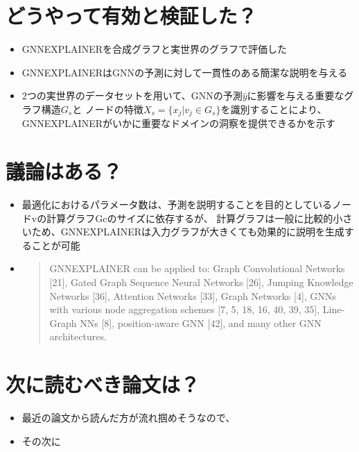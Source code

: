 \documentclass[a4paper,10pt]{ltjsarticle}
\newcommand{\1}{\mbox{1}\hspace{-0.25em}\mbox{l}}
\theoremstyle{definition}
\begin{document}
    \section{どうやって有効と検証した？}
    \begin{itemize}
        \item GNNEXPLAINERを合成グラフと実世界のグラフで評価した
        \item GNNEXPLAINERはGNNの予測に対して一貫性のある簡潔な説明を与える
        \item 2つの実世界のデータセットを用いて、GNNの予測$\hat{y}$に影響を与える重要なグラフ構造$G_s$と
        ノードの特徴$X_s=\{x_j | v_j \in G_s\}$を識別することにより、GNNEXPLAINERがいかに重要なドメインの洞察を提供できるかを示す
    \end{itemize}


    \section{議論はある？}
    \begin{itemize}
        \item 最適化におけるパラメータ数は、予測を説明することを目的としているノードvの計算グラフGcのサイズに依存するが、
        計算グラフは一般に比較的小さいため、GNNEXPLAINERは入力グラフが大きくても効果的に説明を生成することが可能
        \item
        \begin{quotation}
            GNNEXPLAINER can be applied to: Graph Convolutional Networks [21],
            Gated Graph Sequence Neural Networks [26], Jumping Knowledge Networks [36], Attention Networks [33], Graph Networks [4], GNNs with various node aggregation schemes [7, 5, 18, 16, 40, 39, 35], Line-Graph NNs [8], position-aware GNN [42], and many other GNN architectures.
        \end{quotation}
    \end{itemize}


    \section{次に読むべき論文は？}
    \begin{itemize}
        \item 最近の論文から読んだ方が流れ掴めそうなので、\cite{vu2020pgm}
        \item その次に\cite{yuan2021explainability}
    \end{itemize}


    
    
\end{document}
